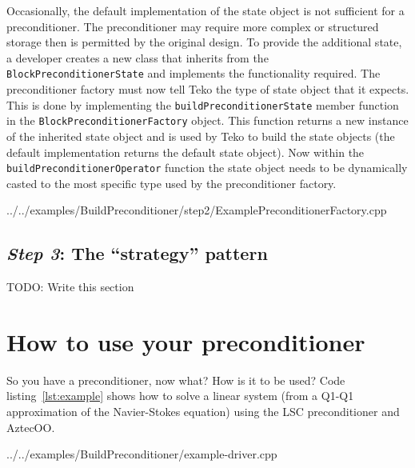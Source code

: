 \documentclass[12pt]{article}
\newcommand{\code}[1]{\lstinline[basicstyle=\footnotesize]!#1!}
\begin{document}
Occasionally, the default implementation of the state object is not sufficient for a preconditioner.
The preconditioner may require more complex or structured storage then is permitted by the original design.
To provide the additional state, a developer creates a new class that inherits from the
\code{BlockPreconditionerState} and implements the functionality required.  The preconditioner factory must
now tell Teko the type of state object that it expects. This is done by implementing the
\code{buildPreconditionerState} member function in the \code{BlockPreconditionerFactory} object. This function
returns a new instance of the inherited state object and is used by Teko to build the state objects (the default
implementation returns the default state object). Now within the \code{buildPreconditionerOperator} function
the state object needs to be dynamically casted to the most specific type used by the preconditioner factory.

\begin{framed}

   {../../examples/BuildPreconditioner/step2/ExamplePreconditionerFactory.cpp}
\end{framed}


\subsection{\emph{Step 3}: The ``strategy'' pattern}
TODO: Write this section

\section{How to use your preconditioner}\label{sec:use-prec}
So you have a preconditioner, now what? How is it to be used? Code listing~\ref{lst:example}
shows how to solve a linear system (from a Q1-Q1 approximation of the Navier-Stokes equation)
using the LSC preconditioner and AztecOO.

\begin{framed}

   {../../examples/BuildPreconditioner/example-driver.cpp}
\end{framed}
\end{document}
